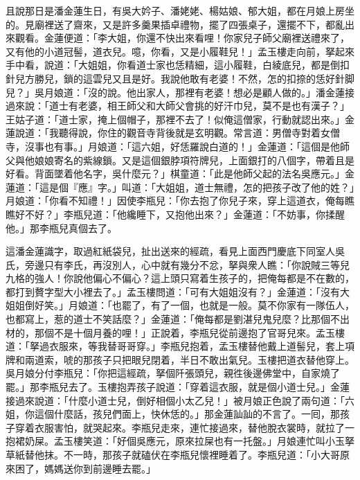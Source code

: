 且說那日是潘金蓮生日，有吳大妗子、潘姥姥、楊姑娘、郁大姐，都在月娘上房坐的。見廟裡送了齋來，又是許多羹果插卓禮物，擺了四張桌子，還擺不下，都亂出來觀看。金蓮便道：「李大姐，你還不快出來看哩！你家兒子師父廟裡送禮來了，又有他的小道冠髻，道衣兒。噫，{}你看，又是小履鞋兒！」孟玉樓走向前，拏起來手中看，說道：「大姐姐，你看道士家也恁精細，這小履鞋，白綾底兒，都是倒扣針兒方勝兒，鎖的這雲兒又且是好。我說他敢有老婆！不然，怎的扣捺的恁好針脚兒？」吳月娘道：「沒的說。他出家人，那裡有老婆！{}想必是顧人做的。」潘金蓮接過來說：「道士有老婆，相王師父和大師父會挑的好汗巾兒，莫不是也有漢子？」{}王姑子道：「道士家，掩上個帽子，那裡不去了！似俺這僧家，行動就認出來。」{}金蓮說道：「我聽得說，你住的觀音寺背後就是玄明觀。常言道：男僧寺對着女僧寺，沒事也有事。」月娘道：「這六姐，好恁羅說白道的！」金蓮道：「這個是他師父與他娘娘寄名的紫線鎖。又是這個銀脖項符牌兒，上面銀打的八個字，帶着且是好看。背面墜着他名字，吳什麼元？」棋童道：「此是他師父起的法名吳應元。」金蓮道：「這是個『應』字。」{}叫道：「大姐姐，道士無禮，怎的把孩子改了他的姓？」{}月娘道：「你看不知禮！」因使李瓶兒：「你去抱了你兒子來，穿上這道衣，俺每瞧瞧好不好？」李瓶兒道：「他纔睡下，又抱他出來？」金蓮道：「不妨事，你揉醒他。」那李瓶兒真個去了。

這潘金蓮識字，取過紅紙袋兒，扯出送來的經疏，看見上面西門慶底下同室人吳氏，旁邊只有李氏，再沒別人，心中就有幾分不忿，拏與衆人瞧：「你說賊三等兒九格的強人！你說他偏心不偏心？這上頭只寫着生孩子的，把俺每都是不在數的，都打到贅字型大小裡去了。」孟玉樓問道：「可有大姐姐沒有？」金蓮道：「沒有大姐姐倒好笑。」{}{}月娘道：「也罷了，有了一個，也就是一般。莫不你家有一隊伍人，也都寫上，惹的道士不笑話麼？」金蓮道：「俺每都是劉湛兒鬼兒麼？比那個不出材的，那個不是十個月養的哩！」正說着，李瓶兒從前邊抱了官哥兒來。孟玉樓道：「拏過衣服來，等我替哥哥穿。」李瓶兒抱着，孟玉樓替他戴上道髻兒，套上項牌和兩道索，唬的那孩子只把眼兒閉着，半日不敢出氣兒。玉樓把道衣替他穿上。吳月娘分付李瓶兒：「你把這經疏，拏個阡張頭兒，親徃後邊佛堂中，自家燒了罷。」那李瓶兒去了。玉樓抱弄孩子說道：「穿着這衣服，就是個小道士兒。」金蓮接過來說道：「什麼小道士兒，倒好相個小太乙兒！」被月娘正色說了兩句道：「六姐，你這個什麼話，孩兒們面上，快休恁的。」那金蓮訕訕的不言了。{}一囘，那孩子穿着衣服害怕，就哭起來。李瓶兒走來，連忙接過來，替他脫衣裳時，就拉了一抱裙奶屎。孟玉樓笑道：「好個吳應元，原來拉屎也有一托盤。」月娘連忙叫小玉拏草紙替他抹。不一時，那孩子就磕伏在李瓶兒懷裡睡着了。李瓶兒道：「小大哥原來困了，媽媽送你到前邊睡去罷。」

